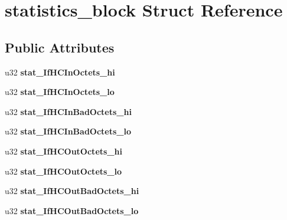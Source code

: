 \hypertarget{structstatistics__block}{
\section{statistics\_\-block Struct Reference}
\label{structstatistics__block}
}
\subsection*{Public Attributes}
\begin{DoxyCompactItemize}
\item 
\hypertarget{structstatistics__block_a69ca5c77a36c93fd80f7703eae417ed0}{
u32 {\bfseries stat\_\-IfHCInOctets\_\-hi}}
\label{structstatistics__block_a69ca5c77a36c93fd80f7703eae417ed0}

\item 
\hypertarget{structstatistics__block_a491fb4a6e33019e6fa5c63b65f216a1e}{
u32 {\bfseries stat\_\-IfHCInOctets\_\-lo}}
\label{structstatistics__block_a491fb4a6e33019e6fa5c63b65f216a1e}

\item 
\hypertarget{structstatistics__block_ae5f92e3aad368e9f656bf52c8e4e79d1}{
u32 {\bfseries stat\_\-IfHCInBadOctets\_\-hi}}
\label{structstatistics__block_ae5f92e3aad368e9f656bf52c8e4e79d1}

\item 
\hypertarget{structstatistics__block_a9149393b42e42d95d231e159da74e4d6}{
u32 {\bfseries stat\_\-IfHCInBadOctets\_\-lo}}
\label{structstatistics__block_a9149393b42e42d95d231e159da74e4d6}

\item 
\hypertarget{structstatistics__block_a1ec2a2159376435d63b69857d1025ab8}{
u32 {\bfseries stat\_\-IfHCOutOctets\_\-hi}}
\label{structstatistics__block_a1ec2a2159376435d63b69857d1025ab8}

\item 
\hypertarget{structstatistics__block_a20cf873e70cc6a22adb3b695cad04042}{
u32 {\bfseries stat\_\-IfHCOutOctets\_\-lo}}
\label{structstatistics__block_a20cf873e70cc6a22adb3b695cad04042}

\item 
\hypertarget{structstatistics__block_a268cfd30e1cafe7b236177d4af6adfe3}{
u32 {\bfseries stat\_\-IfHCOutBadOctets\_\-hi}}
\label{structstatistics__block_a268cfd30e1cafe7b236177d4af6adfe3}

\item 
\hypertarget{structstatistics__block_a15d5057f6bfd5cfdc66efc06c2eb08fb}{
u32 {\bfseries stat\_\-IfHCOutBadOctets\_\-lo}}
\label{structstatistics__block_a15d5057f6bfd5cfdc66efc06c2eb08fb}


\end{DoxyCompactItemize}
